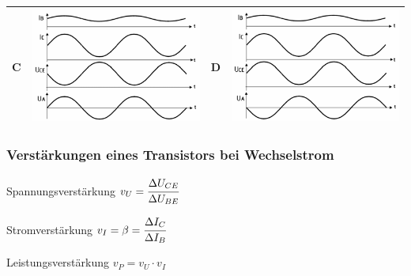 \begin{frame}
\begin{tabular}{p{2.5pc}||l||p{2.5pc}||l}
    C & \includegraphics[width=.25\textwidth,height=.25\textheight,keepaspectratio]{a06/tc626d.png} &
    D & \includegraphics[width=.25\textwidth,height=.25\textheight,keepaspectratio]{a06/tc626b.png} \\ \hline
  \end{tabular}
\end{frame}

\begin{frame}
  \frametitle{Verstärkungen eines Transistors bei Wechselstrom}
  \centering
  \begin{block}{Spannungsverstärkung}
    $v_U = \cfrac{\Delta U_{CE}}{\Delta U_{BE}}$
  \end{block}

  \begin{block}{Stromverstärkung}
    $v_I = \beta = \cfrac{\Delta I_C}{\Delta I_B}$
  \end{block}

  \begin{block}{Leistungsverstärkung}
    $v_P = v_U \cdot v_I$
  \end{block}
\end{frame}


